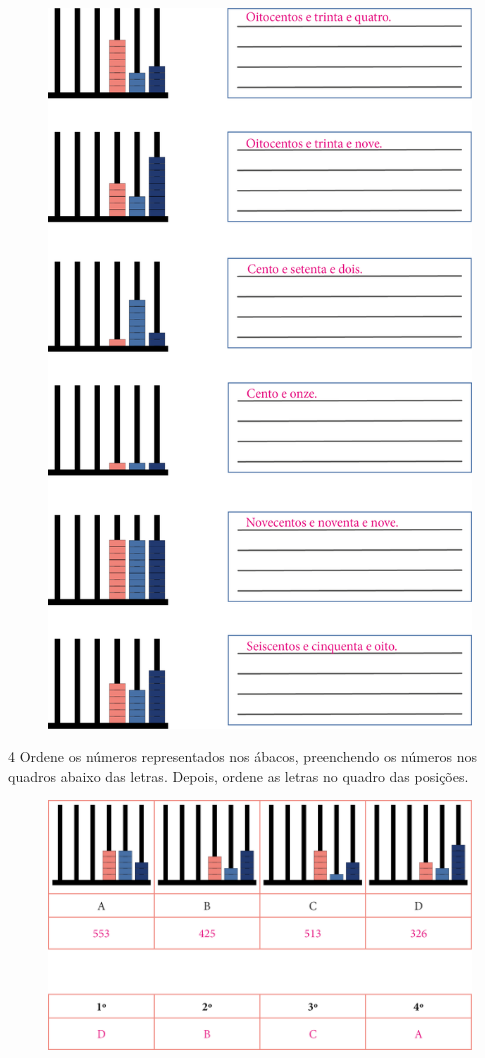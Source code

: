 \begin{figure}[htpb!]
\includegraphics[width=.7\textwidth]{./media/image5.png}
\end{figure}

\pagebreak

\num{4} Ordene os números representados nos ábacos, preenchendo os
números nos quadros abaixo das letras. Depois, ordene as letras no
quadro das posições.

\begin{figure}[htpb!]
\includegraphics[width=\textwidth]{./media/image6.png}
\end{figure}


